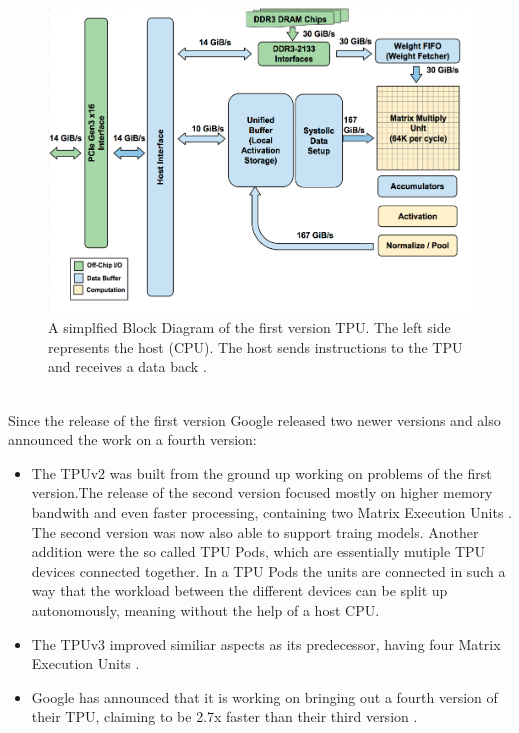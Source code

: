 \documentclass[conference]{IEEEtran}
\begin{document}
\begin{figure}[h]
	\caption{A simplfied Block Diagram of the first version TPU. The left side represents the host (CPU). The host sends instructions to the TPU and receives a data back \cite{jouppi2017datacenter}.}
	\centering
	\includegraphics[width=\linewidth]{pictures/tpu_floorplan.png}
\end{figure}
\\
Since the release of the first version Google released two newer versions and also announced the work on a fourth version:
\begin{itemize}
	\item The TPUv2 was built from the ground up working on problems of the first version.The release of the second version focused mostly on higher memory bandwith and even faster processing, containing two Matrix Execution Units \cite{secondversiontpu}. The second version was now also able to support traing models. Another addition were the so called TPU Pods, which are essentially mutiple TPU devices connected together. In a TPU Pods the units are connected in such a way that the workload between the different devices can be split up autonomously, meaning without the help of a host CPU.
	\item The TPUv3 improved similiar aspects as its predecessor, having four Matrix Execution Units \cite{thirdversiontpu}.
	\item  Google has announced that it is working on bringing out a fourth version of their TPU, claiming to be 2.7x faster than their third version \cite{fourthversiontpu}.
\end{itemize}
\end{document}

